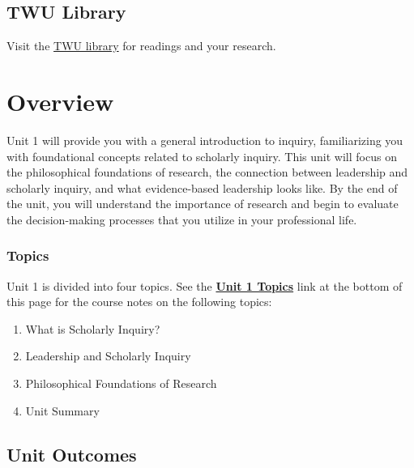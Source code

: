 \documentclass[
  letterpaper,
  DIV=11,
  numbers=noendperiod]{scrreprt}
\providecommand{\tightlist}{%
  \setlength{\itemsep}{0pt}\setlength{\parskip}{0pt}}\usepackage{longtable,booktabs,array}
\begin{document}
\section{TWU Library}\label{twu-library}

Visit the \href{https://www.twu.ca/academics/library}{TWU library} for
readings and your research.


\chapter*{Overview}\label{overview}


Unit 1 will provide you with a general introduction to inquiry,
familiarizing you with foundational concepts related to scholarly
inquiry. This unit will focus on the philosophical foundations of
research, the connection between leadership and scholarly inquiry, and
what evidence-based leadership looks like. By the end of the unit, you
will understand the importance of research and begin to evaluate the
decision-making processes that you utilize in your professional life.

\subsection*{Topics}\label{topics}

Unit 1 is divided into four topics. See the
\href{https://learn.twu.ca/mod/book/view.php?id=1171448}{\textbf{Unit 1
Topics}} link at the bottom of this page for the course notes on the
following topics:

\begin{enumerate}
\def\labelenumi{\arabic{enumi}.}
\tightlist
\item
  What is Scholarly Inquiry?
\item
  Leadership and Scholarly Inquiry
\item
  Philosophical Foundations of Research
\item
  Unit Summary
\end{enumerate}

\section*{Unit Outcomes}\label{unit-outcomes}
\end{document}
